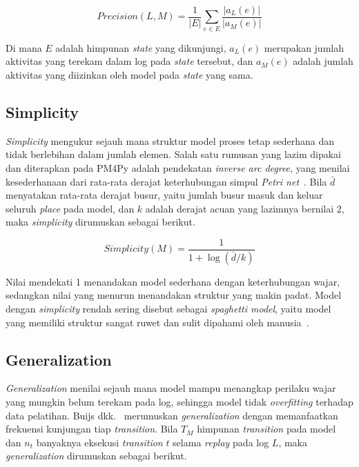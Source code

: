 \begin{equation}
    Precision(L, M) = \frac{1}{|E|} \sum_{e \in E} \frac{|a_L(e)|}{|a_M(e)|}
    \label{eq:precision_formula}
\end{equation}

Di mana $E$ adalah himpunan \textit{state} yang dikunjungi, $a_{L}(e)$ merupakan jumlah aktivitas yang terekam dalam log pada \textit{state} tersebut, dan $a_{M}(e)$ adalah jumlah aktivitas yang diizinkan oleh model pada \textit{state} yang sama.

\subsection{Simplicity}
\textit{Simplicity} mengukur sejauh mana struktur model proses tetap sederhana dan tidak berlebihan dalam jumlah elemen. Salah satu rumusan yang lazim dipakai dan diterapkan pada PM4Py adalah pendekatan \textit{inverse arc degree}, yang menilai kesederhanaan dari rata-rata derajat keterhubungan simpul \textit{Petri net}~\cite{buijs2014quality, berti2019pm4py}. Bila $\bar{d}$ menyatakan rata-rata derajat busur, yaitu jumlah busur masuk dan keluar seluruh \textit{place} pada model, dan $k$ adalah derajat acuan yang lazimnya bernilai 2, maka \textit{simplicity} dirumuskan sebagai berikut.

\begin{equation}
    Simplicity(M) = \frac{1}{1 + \log(\bar{d}/k)}
    \label{eq:simplicity_formula}
\end{equation}

Nilai mendekati 1 menandakan model sederhana dengan keterhubungan wajar, sedangkan nilai yang menurun menandakan struktur yang makin padat. Model dengan \textit{simplicity} rendah sering disebut sebagai \textit{spaghetti model}, yaitu model yang memiliki struktur sangat ruwet dan sulit dipahami oleh manusia~\cite{vanderAalst2016_process_mining, carmona2018conformance}.

\subsection{Generalization}
\textit{Generalization} menilai sejauh mana model mampu menangkap perilaku wajar yang mungkin belum terekam pada log, sehingga model tidak \textit{overfitting} terhadap data pelatihan. Buijs dkk.~\cite{buijs2014quality} merumuskan \textit{generalization} dengan memanfaatkan frekuensi kunjungan tiap \textit{transition}. Bila $T_M$ himpunan \textit{transition} pada model dan $n_t$ banyaknya eksekusi \textit{transition} $t$ selama \textit{replay} pada log $L$, maka \textit{generalization} dirumuskan sebagai berikut.

